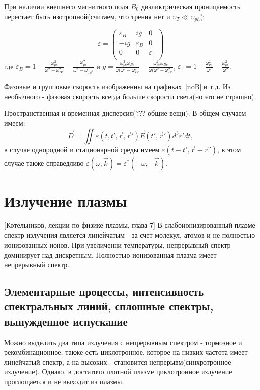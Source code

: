 \documentclass[10pt, a4paper]{article}
\begin{document}
При наличии внешнего магнитного поля $B_0$ диэликтрическая проницаемость перестает быть изотропной(считаем, что трения нет и $\upsilon_T \ll \upsilon_{ph}$):

\begin{equation}
    \label{eq.7.8}
    \varepsilon=
    \begin{pmatrix}
        \varepsilon_B & ig & 0 \\
        -ig & \varepsilon_B & 0 \\
        0 & 0 & \varepsilon_{\parallel}
    \end{pmatrix}
\end{equation}
 где $\varepsilon_B=1-\frac{\omega_{pe}^2}{\omega^2-\omega_{Be}^2}-\frac{\omega_{pi}^2}{\omega^2-\omega_{Bi^2}}$ и $g=\frac{\omega_{pe}^2 \omega_{Be}}{\omega (\omega^2-\omega_{Be}^2} -\frac{\omega_{pe}^2 \omega_{Be}}{\omega (\omega^2-\omega_{Be}^2}$, $\varepsilon_{\parallel}=1-\frac{\omega_{pe}^2}{\omega^2}-\frac{\omega_{pe}^2}{\omega^2}$. 

Фазовые и групповые скорость изображениы на графиках~\ref{noB} и т.д. Из необычного - фазовая скорость всегда больше скорости света(но это не страшно). 

Пространственная и временная дисперсия(??? общие вещи):
В общем случаем имеем:
\begin{equation}
    \label{eq.7.8}
    \overrightarrow{D}=\iint \varepsilon(t,t',\overrightarrow{r},\overrightarrow{r}') \overrightarrow{E}(t',\overrightarrow{r}') d^3 r' dt,
\end{equation}
в случае однородной и стационарной среды имеем $\varepsilon(t-t', \overrightarrow{r}-\overrightarrow{r}')$, в этом случае
также справедливо $\varepsilon(\omega, \overrightarrow{k})= \varepsilon^*(-\omega, -\overrightarrow{k})$.

\section{Излучение плазмы}
\label{sec.10}
[Котельников, лекции по физике плазмы, глава 7]
В слабоионизированный плазме спектр излучения является линейчатым - за счет молекул, атомов и не полностью ионизованных
ионов. При увеличенни температуры, непрерывный спектр доминирует над дискретным. Полностью ионизованная плазма имеет
непрерывный спектр.
\subsection{Элементарные процессы, интенсивность спектральных линий, сплошные спектры, вынужденное испускание}
\label{sec.10.1}
Можно выделить два типа излучения с непрерывным спектром - тормозное и рекомбинационное; также есть циклотронное,
которое на низких частота имеет линейчатый спектр, а на высоких - становится непрерывм(синхротронное излучение). Однако,
в достаточо плотной плазме циклотронное излучение проглощается и не выходит из плазмы.
\end{document}
